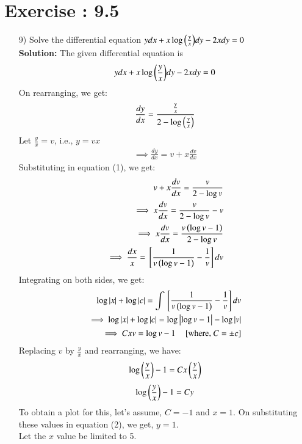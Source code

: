 \documentclass[journal]{IEEEtran}
\begin{document}
\section*{Exercise : 9.5}
\begin{enumerate}
\item [9)] Solve the differential equation $y dx + x \log{\ensuremath{\left(\frac{y}{x}\right)}} dy - 2x dy = 0$\\
\textbf{Solution:}
The given differential equation is 
\begin{align*}
    y dx + x \log{\ensuremath{\left(\frac{y}{x}\right)}} dy - 2x dy = 0
\end{align*}
On rearranging, we get:
\begin{align}
    \frac{dy}{dx} = \frac{\frac{y}{x}}{2 - \log{\ensuremath{\left(\frac{y}{x}\right)}}}
\end{align}
Let $\frac{y}{x} = v$, i.e., $y = vx$
\begin{align*}
    \implies \frac{dy}{dx} = v + x \frac{dv}{dx}
\end{align*}
Substituting in equation (1), we get:
\begin{align*}
    v + x \frac{dv}{dx} = \frac{v}{2 - \log{v}}\\
    \implies x \frac{dv}{dx} = \frac{v}{2 - \log{v}} - v\\
    \implies x \frac{dv}{dx} = \frac{v \left(\log{v} - 1\right)}{2 - \log{v}}\\
    \implies \frac{dx}{x} = {}\left[\frac{1}{v \left(\log{v} - 1\right)} - \frac{1}{v}\right] dv
\end{align*}
Integrating on both sides, we get:
\begin{align*}
    \log{\left\vert x\right\vert} + \log{\left\vert c\right\vert} = \int {}\left[\frac{1}{v \left(\log{v} - 1\right)} - \frac{1}{v}\right] dv\\
    \implies \log{\left\vert x\right\vert} + \log{\left\vert c\right\vert} = \log{\left\vert\log{v} - 1\right\vert} - \log{\left\vert v\right\vert}\\
    \implies C x v = \log{v} - 1 \quad {}\left[\text{where, }C = \pm c\right] 
\end{align*}
Replacing $v$ by $\frac{y}{x}$ and rearranging, we have:
\begin{align*}
    \log{\ensuremath{\left(\frac{y}{x}\right)}} - 1 = C x \left(\frac{y}{x}\right)
\end{align*}
\begin{align}
    \log{\ensuremath{\left(\frac{y}{x}\right)}} - 1 = C y
\end{align}
To obtain a plot for this, let's assume, $C=-1$ and $x = 1$. On substituting these values in equation (2), we get, $y = 1$.\\
Let the $x$ value be limited to 5.

\end{enumerate}
\end{document}
